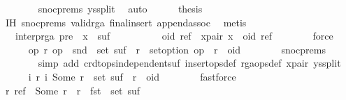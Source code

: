 \begin{isabellebody}
\ \ \ \ \ \ \isamarkupfalse%
\ snoc{\isachardot}prems{\isacharparenleft}{}{\isacharparenright}\ ys{\isacharunderscore}split\ \isamarkupfalse%
\ auto\isanewline
\ \ \ \ \isamarkupfalse%
\ {\isacharquery}thesis\isanewline
\ \ \ \ \ \ \isamarkupfalse%
\ IH\ snoc{\isachardot}prems{\isacharparenleft}{}{\isacharparenright}\ valid{\isacharunderscore}rga\ final{\isacharunderscore}insert\ append{\isacharunderscore}assoc\ \isamarkupfalse%
\ metis\isanewline
\ \ \isamarkupfalse%
\isanewline
\ \ \isamarkupfalse%
\ \isamarkupfalse%
\ {\isachardoublequoteopen}{\isachardot}{\isachardot}{\isachardot}\ {\isacharequal}\ interp{\isacharunderscore}rga\ {\isacharparenleft}pre\ {\isacharat}\ {\isacharbrackleft}x{\isacharbrackright}\ {\isacharat}\ suf{\isacharparenright}{\isachardoublequoteclose}\isanewline
\ \ \isamarkupfalse%
\ {\isacharminus}\isanewline
\ \ \ \ \isamarkupfalse%
\ oid\ ref\ \ x{\isacharunderscore}pair{\isacharcolon}\ {\isachardoublequoteopen}x\ {\isacharequal}\ {\isacharparenleft}oid{\isacharcomma}\ ref{\isacharparenright}{\isachardoublequoteclose}\isanewline
\ \ \ \ \ \ \isamarkupfalse%
\ force\isanewline
\ \ \ \ \isamarkupfalse%
\ {\isachardoublequoteopen}{\isasymAnd}op{}\ r{\isachardot}\ op{}\ {\isasymin}\ snd\ {\isacharbackquote}\ set\ suf\ {\isasymLongrightarrow}\ r\ {\isasymin}\ set{\isacharunderscore}option\ op{}\ {\isasymLongrightarrow}\ r\ {\isasymnoteq}\ oid{\isachardoublequoteclose}\isanewline
\ \ \ \ \ \ \isamarkupfalse%
\ snoc{\isachardot}prems\isanewline
\ \ \ \ \ \ \isamarkupfalse%
\ {\isacharparenleft}simp\ add{\isacharcolon}\ crdt{\isacharunderscore}ops{\isacharunderscore}independent{\isacharunderscore}suf\ insert{\isacharunderscore}ops{\isacharunderscore}def\ rga{\isacharunderscore}ops{\isacharunderscore}def\ x{\isacharunderscore}pair\ ys{\isacharunderscore}split{\isacharparenright}\isanewline
\ \ \ \ \isamarkupfalse%
\ {\isachardoublequoteopen}{\isasymAnd}i\ r{\isachardot}\ {\isacharparenleft}i{\isacharcomma}\ Some\ r{\isacharparenright}\ {\isasymin}\ set\ suf\ {\isasymLongrightarrow}\ r\ {\isasymnoteq}\ oid{\isachardoublequoteclose}\isanewline
\ \ \ \ \ \ \isamarkupfalse%
\ fastforce\ \isanewline
\ \ \ \ \isamarkupfalse%
\ \isamarkupfalse%
\ {\isachardoublequoteopen}{\isasymAnd}r{\isachardot}\ ref\ {\isacharequal}\ Some\ r\ {\isasymLongrightarrow}\ r\ {\isasymnotin}\ fst\ {\isacharbackquote}\ set\ suf{\isachardoublequoteclose}\isanewline

\end{isabellebody}
